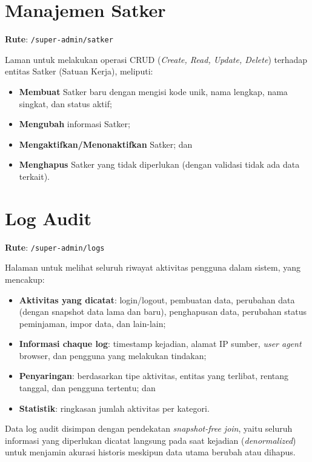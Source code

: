 \documentclass[
  12pt,
  a4paper,
  oneside,
  final
]{report}
\begin{document}
\section{Manajemen Satker}
\textbf{Rute}: \texttt{/super-admin/satker}

Laman untuk melakukan operasi CRUD ({\it Create, Read, Update, Delete})
terhadap entitas Satker (Satuan Kerja), meliputi:
\begin{itemize}
  \item {\bfseries Membuat} Satker baru dengan mengisi kode unik,
        nama lengkap, nama singkat, dan status aktif;
  \item {\bfseries Mengubah} informasi Satker;
  \item {\bfseries Mengaktifkan/Menonaktifkan} Satker; dan
  \item {\bfseries Menghapus} Satker yang tidak diperlukan
        (dengan validasi tidak ada data terkait).
\end{itemize}

\section{Log Audit}
\textbf{Rute}: \texttt{/super-admin/logs}

Halaman untuk melihat seluruh riwayat aktivitas pengguna dalam sistem,
yang mencakup:
\begin{itemize}
  \item {\bfseries Aktivitas yang dicatat}: login/logout, pembuatan
        data, perubahan data (dengan snapshot data lama dan baru),
        penghapusan data, perubahan status peminjaman, impor data,
        dan lain-lain;
  \item {\bfseries Informasi chaque log}: timestamp kejadian, alamat
        IP sumber, {\it user agent} browser, dan pengguna yang
        melakukan tindakan;
  \item {\bfseries Penyaringan}: berdasarkan tipe aktivitas, entitas
        yang terlibat, rentang tanggal, dan pengguna tertentu; dan
  \item {\bfseries Statistik}: ringkasan jumlah aktivitas per kategori.
\end{itemize}

Data log audit disimpan dengan pendekatan {\it snapshot-free join},
yaitu seluruh informasi yang diperlukan dicatat langsung pada saat
kejadian ({\it denormalized}) untuk menjamin akurasi historis
meskipun data utama berubah atau dihapus.
\end{document}
